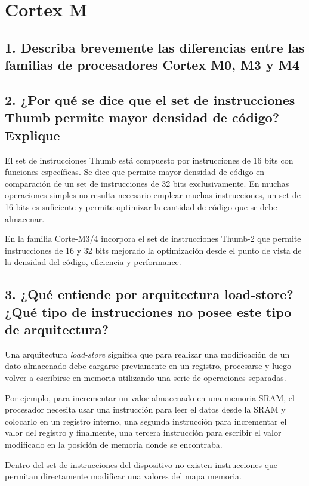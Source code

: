 \documentclass[10pt,a4paper,twoside,spanish]{article}	%
\begin{document}
\section*{Cortex M}

\subsection*{1. Describa brevemente las diferencias entre las familias de procesadores Cortex M0, M3 y M4}

\subsection*{2. ¿Por qué se dice que el set de instrucciones Thumb permite mayor densidad de código? Explique}


El set de instrucciones Thumb está compuesto por instrucciones de 16 bits con funciones específicas. Se dice que permite mayor densidad de código en comparación de un set de instrucciones de 32 bits exclusivamente. En muchas operaciones simples no resulta necesario emplear muchas instrucciones, un set de 16 bits es suficiente y permite optimizar la cantidad de código que se debe almacenar. 

En la familia Corte-M3/4 incorpora el set de instrucciones Thumb-2 que permite instrucciones de 16 y 32 bits mejorado la optimización desde el punto de vista de la densidad del código, eficiencia y performance. 
     

\subsection*{3. ¿Qué entiende por arquitectura load-store? ¿Qué tipo de instrucciones no posee este tipo de arquitectura?}


Una arquitectura \textit{load-store} significa que para realizar una modificación de un dato almacenado debe cargarse previamente en un registro, procesarse y luego volver a escribirse en memoria utilizando una serie de operaciones separadas. 

Por ejemplo, para incrementar un valor almacenado en una memoria SRAM, el procesador necesita usar una instrucción para leer el datos desde la SRAM y colocarlo en un registro interno, una segunda instrucción para incrementar el valor del registro y finalmente, una tercera instrucción para escribir el valor modificado en la posición de memoria donde se encontraba.  

Dentro del set de instrucciones del dispositivo no existen instrucciones que permitan directamente modificar una valores del mapa memoria.
\end{document}

